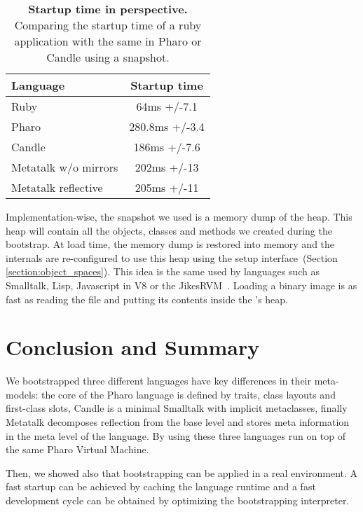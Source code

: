  \begin{table}[ht]
 \small
 	\centering
 	\begin{tabular}{lc}
			\toprule
			\textbf{Language}
 			& \textbf{Startup time}\\
		\toprule
		Ruby &  64ms +/-7.1\\\midrule
		Pharo & 280.8ms +/-3.4\\\midrule
		Candle & 186ms +/-7.6\\\midrule
		Metatalk w/o mirrors &202ms +/-13\\\midrule
		Metatalk reflective &205ms +/-11\\\bottomrule
 	\end{tabular}
	\vspace*{0.2cm}
 	\caption{\small\textbf{Startup time in perspective.} Comparing the startup time of a ruby application with the same in Pharo or Candle using a snapshot.\label{tb:startup}}
 \end{table}

Implementation-wise, the snapshot we used is a memory dump of the \VM heap. This heap will contain all the objects, classes and methods we created during the bootstrap. At load time, the memory dump is restored into memory and the \VM internals are re-configured to use this heap using the \VM setup interface~(Section \ref{section:object_spaces}). This idea is the same used by languages such as Smalltalk, Lisp, Javascript in V8 or the JikesRVM~\cite{Alpe00a}. Loading a binary image is as fast as reading the file and putting its contents inside the \VM's heap.

\section{Conclusion and Summary}



We bootstrapped three different languages have key differences in their meta-models: the core of the Pharo language is defined by traits, class layouts and first-class slots, Candle is a minimal Smalltalk with implicit metaclasses, finally Metatalk decomposes reflection from the base level and stores meta information in the meta level of the language. By using \Vtt these three languages run on top of the same Pharo Virtual Machine.

Then, we showed also that bootstrapping can be applied in a real environment. A fast startup can be achieved by caching the language runtime and a fast development cycle can be obtained by optimizing the bootstrapping interpreter.
